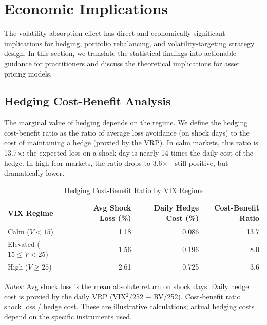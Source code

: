 \documentclass[12pt,a4paper]{article}
\begin{document}
\section{Economic Implications}
\label{sec:implications}

The volatility absorption effect has direct and economically significant implications for hedging, portfolio rebalancing, and volatility-targeting strategy design. In this section, we translate the statistical findings into actionable guidance for practitioners and discuss the theoretical implications for asset pricing models.

\subsection{Hedging Cost-Benefit Analysis}

The marginal value of hedging depends on the regime. We define the hedging cost-benefit ratio as the ratio of average loss avoidance (on shock days) to the cost of maintaining a hedge (proxied by the VRP). In calm markets, this ratio is 13.7$\times$: the expected loss on a shock day is nearly 14 times the daily cost of the hedge. In high-fear markets, the ratio drops to 3.6$\times$---still positive, but dramatically lower.

\begin{table}[H]
\centering
\caption{Hedging Cost-Benefit Ratio by VIX Regime}
\label{tab:hedge_cb}
\begin{threeparttable}
\begin{tabular}{lrrr}
\toprule
VIX Regime & Avg Shock Loss (\%) & Daily Hedge Cost (\%) & Cost-Benefit Ratio \\
\midrule
Calm ($V < 15$)         & 1.18 & 0.086 & 13.7 \\
Elevated ($15 \leq V < 25$) & 1.56 & 0.196 &  8.0 \\
High ($V \geq 25$)      & 2.61 & 0.725 &  3.6 \\
\bottomrule
\end{tabular}
\begin{tablenotes}
\small
\item \textit{Notes:} Avg shock loss is the mean absolute return on shock days. Daily hedge cost is proxied by the daily VRP (VIX$^2$/252 $-$ RV/252). Cost-benefit ratio = shock loss / hedge cost. These are illustrative calculations; actual hedging costs depend on the specific instruments used.
\end{tablenotes}
\end{threeparttable}
\end{table}
\end{document}
